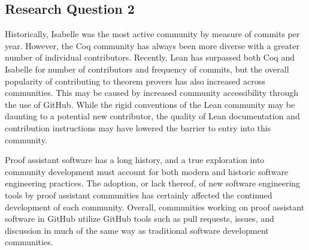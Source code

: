 \documentclass[sigconf,nonacm]{acmart}
\begin{document}
\subsection{Research Question 2}
Historically, Isabelle was the most active community by measure of commits per year. However, the Coq community has always been more diverse with a greater number of individual contributors. Recently, Lean has surpassed both Coq and Isabelle for number of contributors and frequency of commits, but the overall popularity of contributing to theorem provers has also increased across communities. This may be caused by increased community accessibility through the use of GitHub. While the rigid conventions of the Lean community may be daunting to a potential new contributor, the quality of Lean documentation and contribution instructions may have lowered the barrier to entry into this community. 

Proof assistant software has a long history, and a true exploration into community development must account for both modern and historic software engineering practices. The adoption, or lack thereof, of new software engineering tools by proof assistant communities has certainly affected the continued development of each community. Overall, communities working on proof assistant software in GitHub utilize GitHub tools such as pull requests, issues, and discussion in much of the same way as traditional software development communities.



\end{document}
